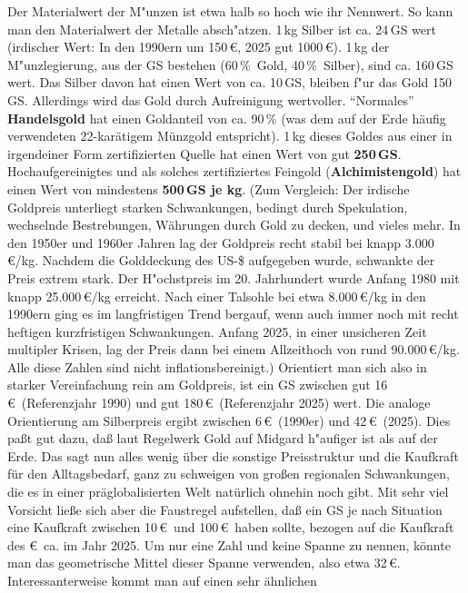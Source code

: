 \documentclass[10pt,a4paper,germanpar]{article}
\begin{document}
Der Materialwert der M"unzen ist etwa halb so hoch wie ihr Nennwert.
So kann man den Materialwert der Metalle absch"atzen. 1\,kg Silber ist
ca. 24\,GS wert (irdischer Wert: In den 1990ern um 150\,\euro, 2025
gut 1000\,\euro). 1\,kg der M"unzlegierung, aus der GS bestehen
(60\,\%\ Gold, 40\,\%\ Silber), sind ca. 160\,GS wert. Das Silber
davon hat einen Wert von ca. 10\,GS, bleiben f"ur das Gold 150\,GS.
Allerdings wird das Gold durch Aufreinigung wertvoller. "`Normales"'
\textbf{Handelsgold} hat einen Goldanteil von ca. 90\,\% (was dem auf
der Erde häufig verwendeten 22-karätigem Münzgold entspricht). 1\,kg
dieses Goldes aus einer in irgendeiner Form zertifizierten Quelle hat
einen Wert von gut \textbf{250\,GS}. Hochaufgereinigtes und als
solches zertifiziertes Feingold (\textbf{Alchimistengold}) hat einen
Wert von mindestens \textbf{500\,GS je kg}. (Zum Vergleich: Der
irdische Goldpreis unterliegt starken Schwankungen, bedingt durch
Spekulation, wechselnde Bestrebungen, Währungen durch Gold zu decken,
und vieles mehr. In den 1950er und 1960er Jahren lag der Goldpreis
recht stabil bei knapp 3.000\,\euro/kg. Nachdem die Golddeckung des
US-\$ aufgegeben wurde, schwankte der Preis extrem stark. Der
H"ochstpreis im 20. Jahrhundert wurde Anfang 1980 mit knapp
25.000\,\euro/kg erreicht. Nach einer Talsohle bei etwa
8.000\,\euro/kg in den 1990ern ging es im langfristigen Trend bergauf,
wenn auch immer noch mit recht heftigen kurzfristigen Schwankungen.
Anfang 2025, in einer unsicheren Zeit multipler Krisen, lag der Preis
dann bei einem Allzeithoch von rund 90.000\,\euro/kg. Alle diese
Zahlen sind nicht inflationsbereinigt.) Orientiert man sich also in
starker Vereinfachung rein am Goldpreis, ist ein GS zwischen gut
16\,\euro\ (Referenzjahr 1990) und gut 180\,\euro\ (Referenzjahr 2025)
wert. Die analoge Orientierung am Silberpreis ergibt zwischen
6\,\euro\ (1990er) und 42\,\euro\ (2025). Dies paßt gut dazu, daß laut
Regelwerk Gold auf Midgard h"aufiger ist als auf der Erde. Das sagt
nun alles wenig über die sonstige Preisstruktur und die Kaufkraft für
den Alltagsbedarf, ganz zu schweigen von großen regionalen
Schwankungen, die es in einer präglobalisierten Welt natürlich ohnehin
noch gibt. Mit sehr viel Vorsicht ließe sich aber die Faustregel
aufstellen, daß ein GS je nach Situation eine Kaufkraft zwischen
10\,\euro\ und 100\,\euro\ haben sollte, bezogen auf die Kaufkraft des
\euro\ ca. im Jahr 2025. Um nur eine Zahl und keine Spanne zu nennen,
könnte man das geometrische Mittel dieser Spanne verwenden, also etwa
32\,\euro. Interessanterweise kommt man auf einen sehr ähnlichen
\end{document}
